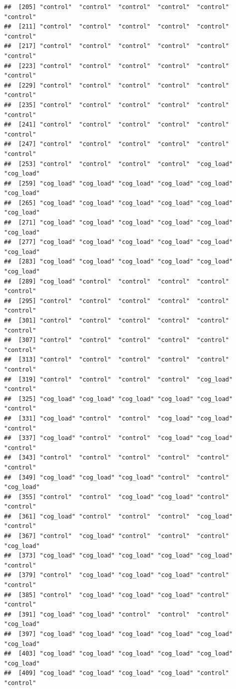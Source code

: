 \documentclass[
  american,
  man,floatsintext]{apa7}
\begin{document}
\begin{verbatim}
##  [205] "control"  "control"  "control"  "control"  "control"  "control" 
##  [211] "control"  "control"  "control"  "control"  "control"  "control" 
##  [217] "control"  "control"  "control"  "control"  "control"  "control" 
##  [223] "control"  "control"  "control"  "control"  "control"  "control" 
##  [229] "control"  "control"  "control"  "control"  "control"  "control" 
##  [235] "control"  "control"  "control"  "control"  "control"  "control" 
##  [241] "control"  "control"  "control"  "control"  "control"  "control" 
##  [247] "control"  "control"  "control"  "control"  "control"  "control" 
##  [253] "control"  "control"  "control"  "control"  "cog_load" "cog_load"
##  [259] "cog_load" "cog_load" "cog_load" "cog_load" "cog_load" "cog_load"
##  [265] "cog_load" "cog_load" "cog_load" "cog_load" "cog_load" "cog_load"
##  [271] "cog_load" "cog_load" "cog_load" "cog_load" "cog_load" "cog_load"
##  [277] "cog_load" "cog_load" "cog_load" "cog_load" "cog_load" "cog_load"
##  [283] "cog_load" "cog_load" "cog_load" "cog_load" "cog_load" "cog_load"
##  [289] "cog_load" "control"  "control"  "control"  "control"  "control" 
##  [295] "control"  "control"  "control"  "control"  "control"  "control" 
##  [301] "control"  "control"  "control"  "control"  "control"  "control" 
##  [307] "control"  "control"  "control"  "control"  "control"  "control" 
##  [313] "control"  "control"  "control"  "control"  "control"  "control" 
##  [319] "control"  "control"  "control"  "control"  "cog_load" "control" 
##  [325] "cog_load" "cog_load" "cog_load" "cog_load" "cog_load" "control" 
##  [331] "cog_load" "control"  "control"  "cog_load" "cog_load" "control" 
##  [337] "cog_load" "control"  "control"  "cog_load" "cog_load" "control" 
##  [343] "control"  "control"  "control"  "control"  "control"  "control" 
##  [349] "cog_load" "cog_load" "cog_load" "control"  "control"  "cog_load"
##  [355] "control"  "control"  "cog_load" "cog_load" "control"  "control" 
##  [361] "cog_load" "control"  "control"  "control"  "cog_load" "control" 
##  [367] "control"  "cog_load" "control"  "control"  "control"  "cog_load"
##  [373] "cog_load" "cog_load" "cog_load" "cog_load" "cog_load" "control" 
##  [379] "control"  "cog_load" "cog_load" "cog_load" "control"  "control" 
##  [385] "control"  "cog_load" "cog_load" "cog_load" "control"  "control" 
##  [391] "cog_load" "cog_load" "control"  "control"  "control"  "cog_load"
##  [397] "cog_load" "cog_load" "cog_load" "cog_load" "cog_load" "cog_load"
##  [403] "cog_load" "cog_load" "cog_load" "cog_load" "cog_load" "cog_load"
##  [409] "cog_load" "cog_load" "cog_load" "cog_load" "control"  "control" 

\end{verbatim}
\end{document}
